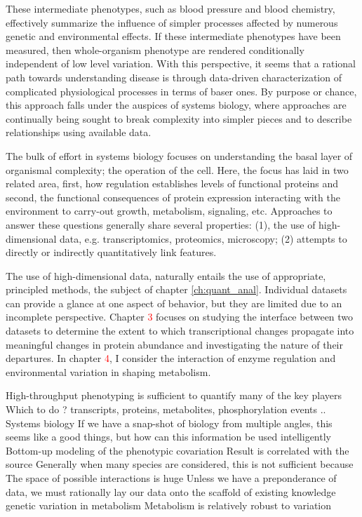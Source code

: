 These intermediate phenotypes, such as blood pressure and blood chemistry, effectively summarize the influence of simpler processes affected by numerous genetic and environmental effects.  If these intermediate phenotypes have been measured, then whole-organism phenotype are rendered conditionally independent of low level variation.  With this perspective, it seems that a rational path towards understanding disease is through data-driven characterization of complicated physiological processes in terms of baser ones. By purpose or chance, this approach falls under the auspices of systems biology, where approaches are continually being sought to break complexity into simpler pieces and to describe relationships using available data.

The bulk of effort in systems biology focuses on understanding the basal layer of organismal complexity; the operation of the cell.  Here, the focus has laid in two related area, first, how regulation establishes levels of functional proteins and second, the functional consequences of protein expression interacting with the environment to carry-out growth, metabolism, signaling, etc.  Approaches to answer these questions generally share several properties: (1), the use of high-dimensional data, e.g. transcriptomics, proteomics, microscopy; (2) attempts to directly or indirectly quantitatively link features.

The use of high-dimensional data, naturally entails the use of appropriate, principled methods, the subject of chapter \ref{ch:quant_anal}. Individual datasets can provide a glance at one aspect of behavior, but they are limited due to an incomplete perspective.  Chapter \textcolor{red}{3} focuses on studying the interface between two datasets to determine the extent to which transcriptional changes propagate into meaningful changes in protein abundance and investigating the nature of their departures.  In chapter \textcolor{red}{4}, I consider the interaction of enzyme regulation and environmental variation in shaping metabolism.


\begin{outline}
\1 High-throughput phenotyping is sufficient to quantify many of the key players
\2 Which to do ? transcripts, proteins, metabolites, phosphorylation events ..
\1 Systems biology
\2 If we have a snap-shot of biology from multiple angles, this seems like a good things, but how can this information be used intelligently
\2 Bottom-up modeling of the phenotypic covariation
\3 Result is correlated with the source
\3 Generally when many species are considered, this is not sufficient because  
\2 The space of possible interactions is huge
\3 Unless we have a preponderance of data, we must rationally lay our data onto the scaffold of existing knowledge
\1 genetic variation in metabolism
\1 Metabolism is relatively robust to variation
\end{outline}


